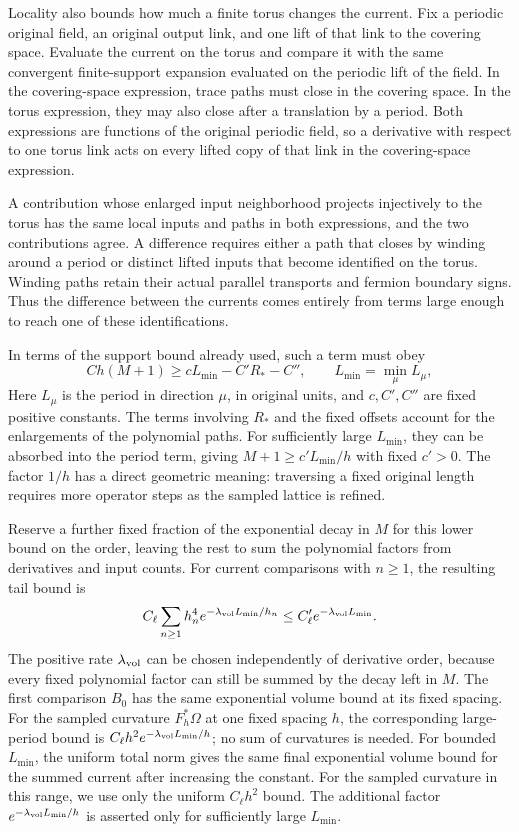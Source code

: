 \documentclass[11pt,a4paper]{article}
\theoremstyle{remark}
\begin{document}
Locality also bounds how much a finite torus changes the current. Fix
a periodic original field, an original output link, and one lift of
that link to the covering space. Evaluate the current on the torus and
compare it with the same convergent finite-support expansion evaluated
on the periodic lift of the field. In the covering-space expression,
trace paths must close in the covering space. In the torus expression,
they may also close after a translation by a period. Both expressions
are functions of the original periodic field, so a derivative with
respect to one torus link acts on every lifted copy of that link in
the covering-space expression.

A contribution whose enlarged input neighborhood projects injectively
to the torus has the same local inputs and paths in both expressions,
and the two contributions agree. A difference requires either a path
that closes by winding around a period or distinct lifted inputs that
become identified on the torus. Winding paths retain their actual
parallel transports and fermion boundary signs. Thus the difference
between the currents comes entirely from terms large enough to reach
one of these identifications.

In terms of the support bound already used, such a term must obey
\begin{equation}
 Ch(M+1)\ge cL_{\min}-C'R_*-C'',
 \qquad L_{\min}=\min_\mu L_\mu,
\end{equation}
Here $L_\mu$ is the period in direction $\mu$, in original units,
and $c,C',C''$ are fixed positive constants. The terms involving
$R_*$ and the fixed offsets account for the enlargements of the
polynomial paths. For sufficiently large $L_{\min}$, they can be
absorbed into the period term, giving
$M+1\ge c'L_{\min}/h$ with fixed $c'>0$. The factor $1/h$
has a direct geometric meaning: traversing a fixed original length
requires more operator steps as the sampled lattice is refined.

Reserve a further fixed fraction of the exponential decay in $M$ for
this lower bound on the order, leaving the rest to sum the polynomial
factors from derivatives and input counts. For current comparisons with
$n\ge1$, the resulting tail bound is
\begin{equation}
 C_\ell\sum_{n\ge1}h_n^4
         e^{-\lambda_{\rm vol}L_{\min}/h_n}
       \le C'_\ell e^{-\lambda_{\rm vol}L_{\min}}.
 \label{app:a:finite-volume}
\end{equation}
The positive rate $\lambda_{\rm vol}$ can be chosen independently
of derivative order, because every fixed polynomial factor can still
be summed by the decay left in $M$. The first comparison $B_0$ has
the same exponential volume bound at its fixed spacing. For the sampled
curvature $F_h^*\Omega$ at one fixed spacing $h$, the corresponding
large-period bound is
$C_\ell h^2e^{-\lambda_{\rm vol}L_{\min}/h}$; no sum of
curvatures is needed. For bounded $L_{\min}$, the uniform total norm gives the same final
exponential volume bound for the summed current after increasing the
constant. For the sampled curvature in this range, we use only the
uniform $C_\ell h^2$ bound. The additional factor
$e^{-\lambda_{\rm vol}L_{\min}/h}$ is asserted only for sufficiently
large $L_{\min}$.
\end{document}
